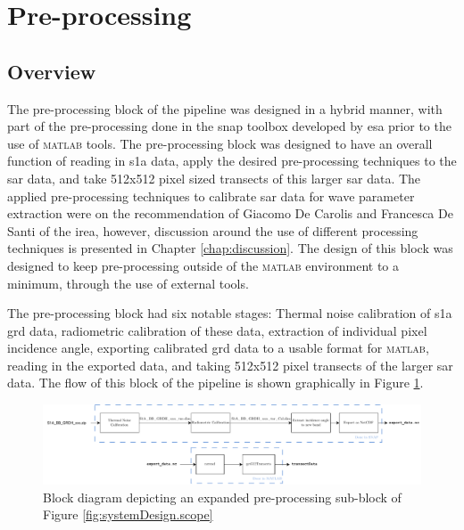 \section{Pre-processing} \label{sec:systemDesign.preProcessing}


\subsection{Overview} \label{subsec:systemDesign.preProcessing.Overview}

The pre-processing block of the pipeline was designed in a hybrid manner, with part of the pre-processing done in the \ac{snap} toolbox developed by \ac{esa} prior to the use of \textsc{matlab} tools. The pre-processing block was designed to have an overall function of reading in \ac{s1a} data, apply the desired pre-processing techniques to the \acs{sar} data, and take 512x512 pixel sized transects of this larger \acs{sar} data. The applied pre-processing techniques to calibrate \acs{sar} data for wave parameter extraction were on the recommendation of Giacomo De Carolis and Francesca De Santi of the \acs{irea}, however, discussion around the use of different processing techniques is presented in Chapter \ref{chap:discussion}. The design of this block was designed to keep pre-processing outside of the \textsc{matlab} environment to a minimum, through the use of external tools. 

The pre-processing block had six notable stages: Thermal noise calibration of \acs{s1a} \acs{grd} data, radiometric calibration of these data, extraction of individual pixel incidence angle, exporting calibrated \acs{grd} data to a usable format for \textsc{matlab}, reading in the exported data, and taking 512x512 pixel transects of the larger \acs{sar} data. The flow of this block of the pipeline is shown graphically in Figure \ref{fig:systemDesign.preProcessing.blockDiagram}.

\begin{figure}[H]
    \centering
    \includegraphics[width=.95\linewidth]{Figures/PipelineDesign/pre_processing.pdf}
    \caption{Block diagram depicting an expanded pre-processing sub-block of Figure \ref{fig:systemDesign.scope}}
    \label{fig:systemDesign.preProcessing.blockDiagram}
\end{figure}

